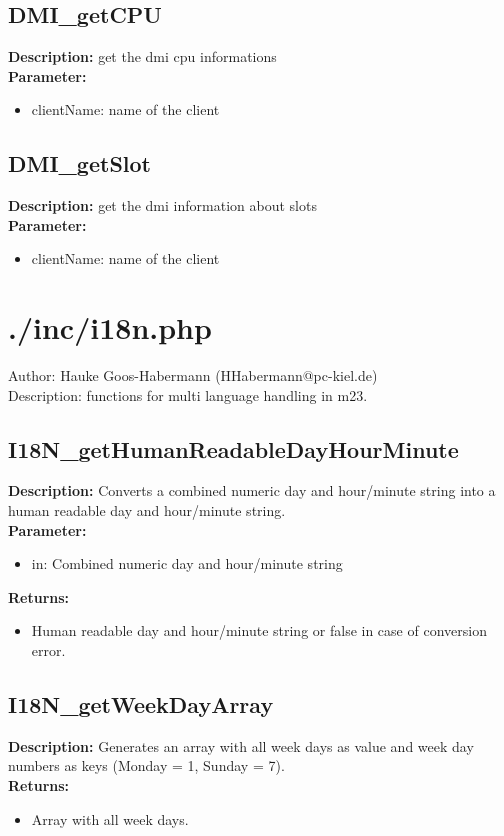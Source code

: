 \subsection{DMI\_getCPU}
\textbf{Description:} get the dmi cpu informations\\
\textbf{Parameter:}
\begin{itemize}
\item clientName: name of the client
\end{itemize}

\subsection{DMI\_getSlot}
\textbf{Description:} get the dmi information about slots\\
\textbf{Parameter:}
\begin{itemize}
\item clientName: name of the client
\end{itemize}

\newpage\section{./inc/i18n.php}
 Author: Hauke Goos-Habermann (HHabermann@pc-kiel.de)\\
 Description: functions for multi language handling in m23.\\

\subsection{I18N\_getHumanReadableDayHourMinute}
\textbf{Description:} Converts a combined numeric day and hour/minute string into a human readable day and hour/minute string.\\
\textbf{Parameter:}
\begin{itemize}
\item in: Combined numeric day and hour/minute string
\end{itemize}
\textbf{Returns:}
\begin{itemize}
\item Human readable day and hour/minute string or false in case of conversion error.
\end{itemize}

\subsection{I18N\_getWeekDayArray}
\textbf{Description:} Generates an array with all week days as value and week day numbers as keys (Monday = 1, Sunday = 7).\\
\textbf{Returns:}
\begin{itemize}
\item Array with all week days.
\end{itemize}

